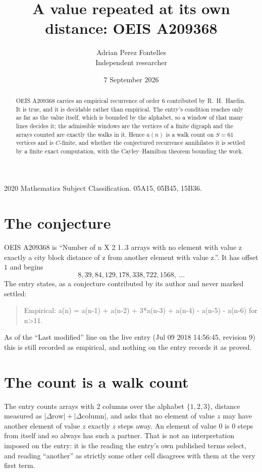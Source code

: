 \documentclass[11pt,a4paper]{article}
\title{A value repeated at its own distance: OEIS A209368}
\author{Adrian Perez Fontelles\\ \small Independent researcher}
\date{7 September 2026}
\theoremstyle{plain}
\theoremstyle{definition}
\begin{document}
\maketitle

\begin{abstract}
OEIS A209368 carries an empirical recurrence of order $6$ contributed by R.~H.~Hardin. It is
true, and it is decidable rather than empirical. The entry's condition reaches only as far as the value itself, which is bounded by the
alphabet, so a window of that many lines decides it; the
admissible windows are the vertices of a finite digraph and the arrays counted are exactly the
walks in it. Hence $a(n)$ is a walk count on $S=61$ vertices and is $C$-finite, and whether the
conjectured recurrence annihilates it is settled by a finite exact computation, with the
Cayley--Hamilton theorem bounding the work.
\end{abstract}

\noindent\small 2020 Mathematics Subject Classification. 05A15, 05B45, 15B36.\normalsize

\section{The conjecture}

OEIS A209368 is ``Number of n X 2 1..3 arrays with no element with value z exactly a city block distance of z from another element with value z.''. It has offset $1$ and begins
\[
8, 39, 84, 129, 178, 338, 722, 1568,\ \dots
\]
The entry states, as a conjecture contributed by its author and never marked settled:
\begin{quote}
Empirical: a(n) = a(n-1) + a(n-2) + 3*a(n-3) + a(n-4) - a(n-5) - a(n-6) for n>11.
\end{quote}
As of the ``Last modified'' line on the live entry (Jul 09 2018 14:56:45, revision 9) this is still
recorded as empirical, and nothing on the entry records it as proved.

\section{The count is a walk count}

The entry counts arrays with $2$ columns over the alphabet $\{1,2,3\}$, distance measured as $|\Delta \text{row}|+|\Delta \text{column}|$, and asks that no element of value $z$ may have another element of value $z$ exactly $z$ steps away. An element of value $0$ is $0$ steps from itself and so always has such a partner. That is not an interpretation imposed on the entry: it is the reading the entry's own published terms select, and reading ``another'' as strictly some other cell disagrees with them at the very first term.
\end{document}
